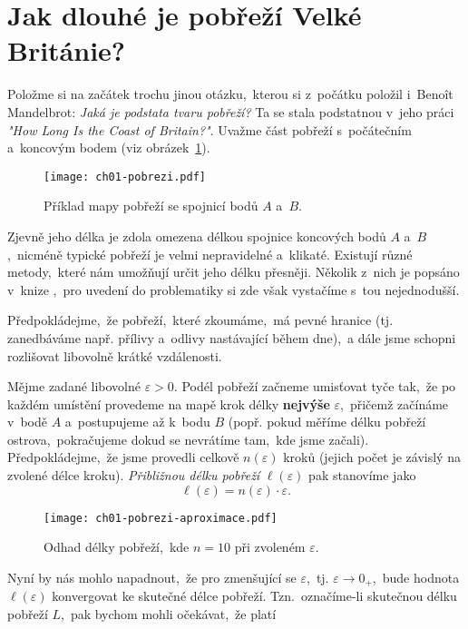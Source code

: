 \section{Jak dlouhé je pobřeží Velké Británie?}\label{sec:pobrezi_velke_britanie}
Položme si na začátek trochu jinou otázku,~kterou si z~počátku položil i~Benoît Mandelbrot: \emph{Jaká je podstata tvaru pobřeží?} Ta se stala podstatnou v~jeho práci \emph{"How Long Is the Coast of Britain?"}. Uvažme část pobřeží s~počátečním a~koncovým bodem (viz obrázek~\ref{fig:pobrezi}).
\begin{figure}[h]
    \centering
    \texttt{[image: ch01-pobrezi.pdf]}
    \caption{Příklad mapy pobřeží se spojnicí bodů $A$ a~$B$.}
    \label{fig:pobrezi}
\end{figure}
Zjevně jeho délka je zdola omezena délkou spojnice koncových bodů $A$ a~$B$,~nicméně typické pobřeží je velmi nepravidelné a~klikaté. Existují různé metody,~které nám umožňují určit jeho délku přesněji. Několik z~nich je popsáno v~knize \citep[str. 79]{Mandelbrot1983},~pro uvedení do problematiky si zde však vystačíme s~tou nejednodušší.\par
Předpokládejme,~že pobřeží,~které zkoumáme,~má pevné hranice (tj. zanedbáváme např. přílivy a~odlivy nastávající během dne),~a dále jsme schopni rozlišovat libovolně krátké vzdálenosti.\par
Mějme zadané libovolné $\varepsilon>0$. Podél pobřeží začneme umisťovat tyče tak,~že po každém umístění provedeme na mapě krok délky \textbf{nejvýše} $\varepsilon$,~přičemž začínáme v~bodě $A$ a~postupujeme až k~bodu $B$ (popř. pokud měříme délku pobřeží ostrova,~pokračujeme dokud se nevrátíme tam,~kde jsme začali). Předpokládejme,~že jsme provedli celkově $n(\varepsilon)$ kroků (jejich počet je závislý na zvolené délce kroku). \emph{Přibližnou délku pobřeží} $\ell(\varepsilon)$ pak stanovíme jako
\begin{equation*}
    \ell(\varepsilon)=n(\varepsilon)\cdot\varepsilon.
\end{equation*}
\begin{figure}[h]
    \centering
    \texttt{[image: ch01-pobrezi-aproximace.pdf]}
    \caption{Odhad délky pobřeží,~kde $n=10$ při zvoleném $\varepsilon$.}
    \label{fig:pobrezi_aproximace}
\end{figure}
Nyní by nás mohlo napadnout,~že pro zmenšující se $\varepsilon$,~tj. $\varepsilon\to0_+$,~bude hodnota $\ell(\varepsilon)$ konvergovat ke skutečné délce pobřeží. Tzn.~označíme-li skutečnou délku pobřeží $L$,~pak bychom mohli očekávat,~že platí
